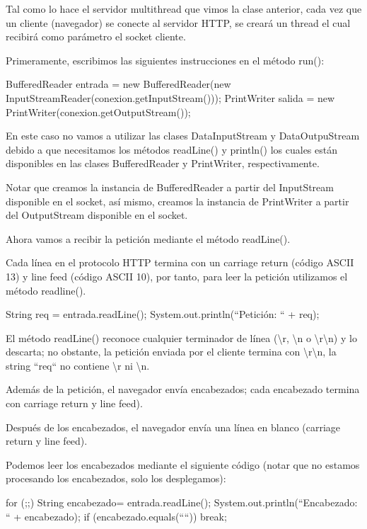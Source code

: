 \documentclass[11pt,a4paper,oneside]{book}
\begin{document}
Tal como lo hace el servidor multithread que vimos la clase anterior, cada vez que un cliente (navegador) se conecte al servidor HTTP, se creará un thread el cual recibirá como parámetro el socket cliente.

Primeramente, escribimos las siguientes instrucciones en el método run():

\begin{SourceCode}
BufferedReader entrada = new BufferedReader(new InputStreamReader(conexion.getInputStream()));
PrintWriter salida = new PrintWriter(conexion.getOutputStream());
\end{SourceCode}

En este caso no vamos a utilizar las clases DataInputStream y DataOutpuStream debido a que necesitamos los métodos readLine() y println() los cuales están disponibles en las clases BufferedReader y PrintWriter, respectivamente.

Notar que creamos la instancia de BufferedReader a partir del InputStream disponible en el socket, así mismo, creamos la instancia de PrintWriter a partir del OutputStream disponible en el socket.

Ahora vamos a recibir la petición mediante el método readLine().

Cada línea en el protocolo HTTP termina con un carriage return (código ASCII 13) y line feed (código ASCII 10), por tanto, para leer la petición utilizamos el método readline().

\begin{SourceCode}
String req = entrada.readLine();
System.out.println(``Petición: `` + req);
\end{SourceCode}

El método readLine() reconoce cualquier terminador de línea (\textbackslash{}r, \textbackslash{}n o \textbackslash{}r\textbackslash{}n) y lo descarta; no obstante, la petición enviada por el cliente termina con \textbackslash{}r\textbackslash{}n, la string ``req`` no contiene \textbackslash{}r ni \textbackslash{}n.

Además de la petición, el navegador envía encabezados; cada encabezado termina con carriage return  y line feed).

Después de los encabezados, el navegador envía una línea en blanco (carriage return  y line feed).

Podemos leer los encabezados mediante el siguiente código (notar que no estamos procesando los encabezados, solo los desplegamos):

\begin{SourceCode}
for (;;)
{
  String encabezado= entrada.readLine();
  System.out.println(``Encabezado: `` + encabezado);
  if (encabezado.equals(````)) break;
}
\end{SourceCode}
\end{document}

